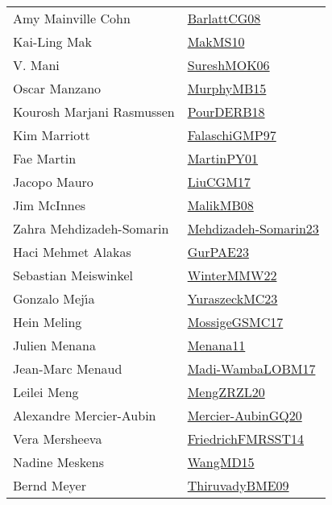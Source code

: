 {\begin{longtable}{p{4cm}p{20cm}}
Amy Mainville Cohn & \href{papers/BarlattCG08.pdf}{BarlattCG08}\cite{BarlattCG08} \\
Kai{-}Ling Mak & \href{papers/MakMS10.pdf}{MakMS10}\cite{MakMS10} \\
V. Mani & \href{articles/SureshMOK06.pdf}{SureshMOK06}\cite{SureshMOK06} \\
Oscar Manzano & \href{papers/MurphyMB15.pdf}{MurphyMB15}\cite{MurphyMB15} \\
Kourosh Marjani Rasmussen & \href{articles/PourDERB18.pdf}{PourDERB18}\cite{PourDERB18} \\
Kim Marriott & \href{articles/FalaschiGMP97.pdf}{FalaschiGMP97}\cite{FalaschiGMP97} \\
Fae Martin & \href{articles/MartinPY01.pdf}{MartinPY01}\cite{MartinPY01} \\
Jacopo Mauro & \href{papers/LiuCGM17.pdf}{LiuCGM17}\cite{LiuCGM17} \\
Jim McInnes & \href{articles/MalikMB08.pdf}{MalikMB08}\cite{MalikMB08} \\
Zahra Mehdizadeh{-}Somarin & \href{papers/Mehdizadeh-Somarin23.pdf}{Mehdizadeh-Somarin23}\cite{Mehdizadeh-Somarin23} \\
Haci Mehmet Alakas & \href{articles/GurPAE23.pdf}{GurPAE23}\cite{GurPAE23} \\
Sebastian Meiswinkel & \href{papers/WinterMMW22.pdf}{WinterMMW22}\cite{WinterMMW22} \\
Gonzalo Mej{\'{\i}}a & \href{papers/YuraszeckMC23.pdf}{YuraszeckMC23}\cite{YuraszeckMC23} \\
Hein Meling & \href{papers/MossigeGSMC17.pdf}{MossigeGSMC17}\cite{MossigeGSMC17} \\
Julien Menana & \href{}{Menana11}\cite{Menana11} \\
Jean{-}Marc Menaud & \href{papers/Madi-WambaLOBM17.pdf}{Madi-WambaLOBM17}\cite{Madi-WambaLOBM17} \\
Leilei Meng & \href{articles/MengZRZL20.pdf}{MengZRZL20}\cite{MengZRZL20} \\
Alexandre Mercier{-}Aubin & \href{papers/Mercier-AubinGQ20.pdf}{Mercier-AubinGQ20}\cite{Mercier-AubinGQ20} \\
Vera Mersheeva & \href{papers/FriedrichFMRSST14.pdf}{FriedrichFMRSST14}\cite{FriedrichFMRSST14} \\
Nadine Meskens & \href{articles/WangMD15.pdf}{WangMD15}\cite{WangMD15} \\
Bernd Meyer & \href{papers/ThiruvadyBME09.pdf}{ThiruvadyBME09}\cite{ThiruvadyBME09} \\

\end{longtable}}

